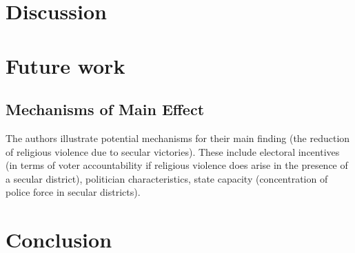 \documentclass{scrartcl}
\begin{document}
\section{Discussion}


\section{Future work}
\subsection{Mechanisms of Main Effect}

The authors illustrate potential mechanisms for their main finding (the reduction of religious violence due to secular victories). These include electoral incentives (in terms of voter accountability if religious violence does arise in the presence of a secular district), politician characteristics, state capacity (concentration of police force in secular districts).

\section{Conclusion}


\medskip



\end{document}
